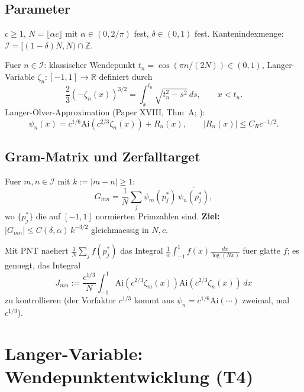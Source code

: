 \documentclass[12pt,a4paper]{amsart}
\theoremstyle{definition}
\newcommand{\Ai}{\mathrm{Ai}}
\newcommand{\zn}{\zeta_n}
\newcommand{\zm}{\zeta_m}
\newcommand{\tn}{t_n}
\begin{document}
\subsection{Parameter}

$c \ge 1$, $N = \lfloor \alpha c \rfloor$ mit $\alpha \in (0, 2/\pi)$ fest,
$\delta \in (0,1)$ fest.
Kantenindexmenge: $\mathcal{I} = [(1-\delta)N, N) \cap \mathbb{Z}$.

Fuer $n \in \mathcal{I}$: klassischer Wendepunkt $\tn = \cos(\pi n/(2N)) \in (0,1)$,
Langer-Variable $\zn : [-1,1] \to \mathbb{R}$ definiert durch
\begin{equation}\label{eq:langer}
  \frac{2}{3}(-\zn(x))^{3/2} = \int_x^{\tn}\sqrt{\tn^2 - s^2}\,ds,
  \qquad x < \tn.
\end{equation}
Langer-Olver-Approximation (Paper XVIII, Thm~A; \cite{PaperXVIII}):
\begin{equation}\label{eq:LO}
  \psi_n(x) = c^{1/6}\Ai(c^{2/3}\zn(x)) + R_n(x),
  \qquad |R_n(x)| \le C_R c^{-1/2}.
\end{equation}

\subsection{Gram-Matrix und Zerfalltarget}

Fuer $m, n \in \mathcal{I}$ mit $k := |m-n| \ge 1$:
\begin{equation}\label{eq:Gmn}
  G_{mn} = \frac{1}{N}\sum_{j}\psi_m(p_j^*)\,\overline{\psi_n(p_j^*)},
\end{equation}
wo $\{p_j^*\}$ die auf $[-1,1]$ normierten Primzahlen sind.
\textbf{Ziel:} $|G_{mn}| \le C(\delta,\alpha)\,k^{-3/2}$ gleichmaessig in $N, c$.

Mit PNT naehert $\frac{1}{N}\sum_j f(p_j^*)$ das Integral $\frac{1}{\alpha}\int_{-1}^{1}f(x)\frac{dx}{\log(Nx)}$
fuer glatte $f$; es genuegt, das Integral
\begin{equation}\label{eq:Jmn}
  J_{mn} := \frac{c^{1/3}}{N}\int_{-1}^{1}\Ai(c^{2/3}\zm(x))\Ai(c^{2/3}\zn(x))\,dx
\end{equation}
zu kontrollieren (der Vorfaktor $c^{1/3}$ kommt aus $\psi_n = c^{1/6}\Ai(\cdots)$ zweimal,
mal $c^{1/3}$).

\section{Langer-Variable: Wendepunktentwicklung (T4)}
\label{sec:langer}
\end{document}
